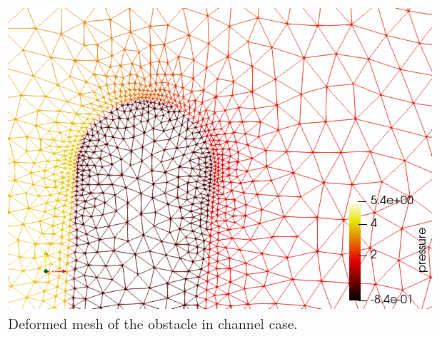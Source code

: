 \begin{figure}[h]
\centering
\includegraphics[width=140mm]{fsi_obstacle_deformed}
\caption{Deformed mesh of the obstacle in channel case.}\label{fg:fsi_obstacle_deformed}
\end{figure} 



\hfill
\mbox{}
